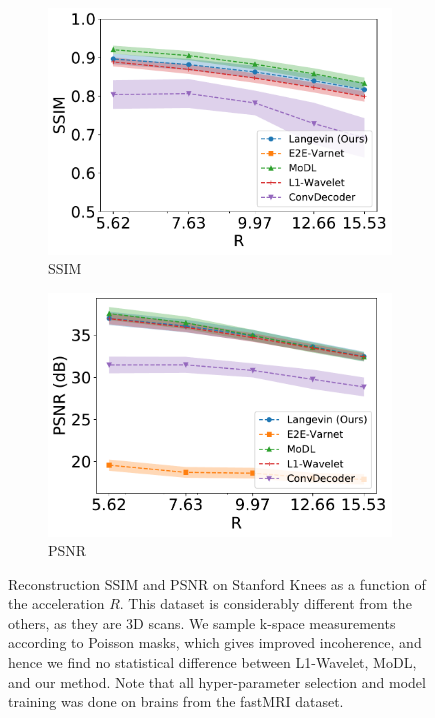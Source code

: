 \begin{figure}
    \centering
    \begin{subfigure}{0.48\columnwidth}
    \centering
    \includegraphics[width=\columnwidth]{stanford-poisson-ssim.pdf}
    \caption{SSIM}
    \label{fig:stanford-ssim}
    \end{subfigure}
    \hfill
    \begin{subfigure}{0.48\columnwidth}
    \centering
    \includegraphics[width=\columnwidth]{stanford-poisson-psnr.pdf}
    \caption{PSNR}
    \label{fig:stanford-psnr}
    \end{subfigure}
    \caption{Reconstruction SSIM and PSNR on Stanford Knees as a function of the acceleration $R$. This dataset is considerably different from the others, as they are 3D scans. We sample k-space measurements according to Poisson masks, which gives improved incoherence, and hence we find no statistical difference between L1-Wavelet, MoDL, and our method. Note that all hyper-parameter selection and model training was done on brains from the fastMRI dataset.}
    \label{fig:stanford-psnr-ssim}
\end{figure}

